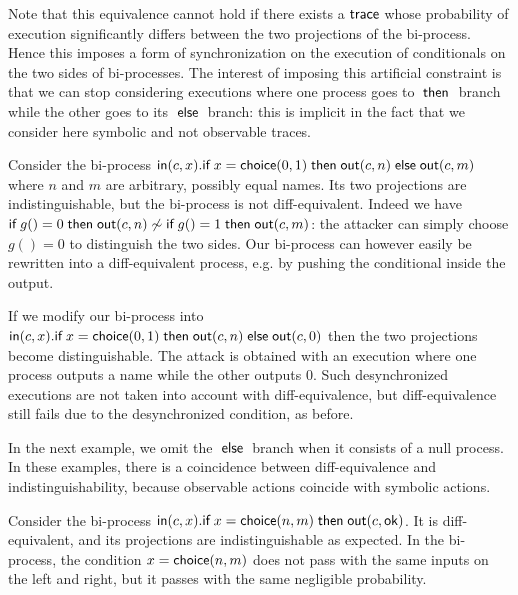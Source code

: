 Note that this equivalence cannot hold if there exists a $\textsf{trace}$
whose probability of execution significantly differs between the two
projections of the bi-process.
Hence this imposes a form of synchronization on the execution of
conditionals on the two sides of bi-processes.
The interest of imposing this artificial constraint is that we
can stop considering executions where one process goes to $\;\textsf{then}\;$
branch while the other goes to its $\;\textsf{else}\;$ branch: this is implicit
in the fact that we consider here symbolic and not observable traces.

\newcommand{\In}{\mathsf{in}}
\newcommand{\Out}{\mathsf{out}}

\begin{example}
  Consider the bi-process
  $\In(c,x).\myif x=\diff{0}{1} \mythen \Out(c,n) \myelse \Out(c,m)$
  where $n$ and $m$ are arbitrary, possibly equal names.
  Its two projections are indistinguishable, but the
  bi-process is not diff-equivalent.
  Indeed we have
  $\myif g()=0 \mythen \Out(c,n) \not\sim
   \myif g()=1 \mythen \Out(c,m)$: the attacker can simply choose
  $g()=0$ to distinguish the two sides.
  Our bi-process can however easily be
  rewritten into a diff-equivalent process, e.g. by pushing the conditional
  inside the output.

  If we modify our bi-process into
  $\In(c,x).\myif x=\diff{0}{1} \mythen \Out(c,n) \myelse \Out(c,0)$
  then the two projections become distinguishable.
  The attack is obtained with an execution
  where one process outputs a name while the other outputs $0$. Such
  desynchronized executions are not taken into account with diff-equivalence,
  but diff-equivalence still fails due to the desynchronized condition,
  as before.
\end{example}

In the next example, we omit the $\;\textsf{else}\;$ branch when it consists of a null
process. In these examples, there is a coincidence between diff-equivalence
and indistinguishability, because observable actions coincide with symbolic
actions.

\begin{example} \label{ex:negl}
  Consider the bi-process
  $\In(c,x).\myif x=\diff{n}{m} \mythen \Out(c,\ok)$.
  It is diff-equivalent, and its projections are
  indistinguishable as expected.
  In the bi-process, the condition $x=\mathsf{choice}(n,m)$ does not pass
  with the same inputs on the left and right, but it passes with
  the same negligible probability.
\end{example}

